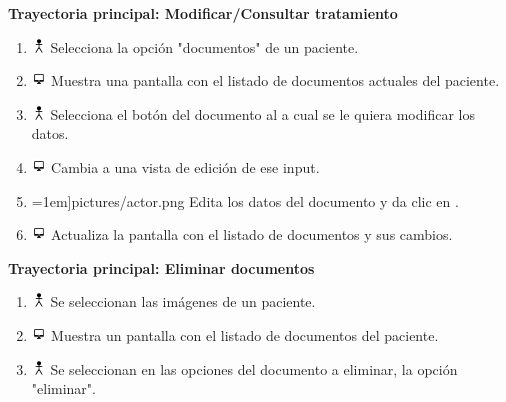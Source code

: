 \textbf{Trayectoria principal: Modificar/Consultar tratamiento}        
\begin{enumerate}
\item \includegraphics[height=1em]{pictures/actor.png} Selecciona la opción "documentos" de un paciente.
\item \includegraphics[height=1em]{pictures/sistema.png} Muestra una pantalla con el listado de documentos actuales del paciente.
\item \includegraphics[height=1em]{pictures/actor.png} Selecciona el botón  del documento al a cual se le quiera modificar los datos.
\item \includegraphics[height=1em]{pictures/sistema.png} Cambia a una vista de edición de ese input.
\item {}=1em]{pictures/actor.png} Edita los datos del documento y da clic en .
\item \includegraphics[height=1em]{pictures/sistema.png} Actualiza la pantalla con el listado de documentos y sus cambios.
\end{enumerate} \bigskip

\textbf{Trayectoria principal: Eliminar documentos}  
\begin{enumerate}
\item \includegraphics[height=1em]{pictures/actor.png} Se seleccionan las imágenes de un paciente.
\item \includegraphics[height=1em]{pictures/sistema.png} Muestra un pantalla con el listado de documentos del paciente.
\item \includegraphics[height=1em]{pictures/actor.png} Se seleccionan en las opciones del documento a eliminar, la opción "eliminar".
\end{enumerate} \bigskip



